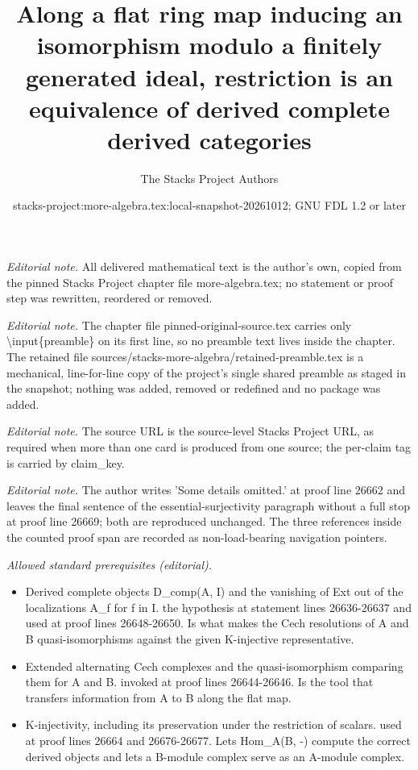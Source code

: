 \documentclass[10pt,a4paper]{amsart}
\title{Along a flat ring map inducing an isomorphism modulo a finitely generated ideal, restriction is an equivalence of derived complete derived categories}
\author{The Stacks Project Authors}
\date{stacks-project:more-algebra.tex:local-snapshot-20261012; GNU FDL 1.2 or later}
\theoremstyle{plain}
\theoremstyle{definition}
\theoremstyle{remark}
\numberwithin{equation}{subsection}
\begin{document}
\maketitle
\setcounter{subsection}{1}
\noindent\textit{Editorial note.} All delivered mathematical text is the author's own, copied from the pinned Stacks Project chapter file more-algebra.tex; no statement or proof step was rewritten, reordered or removed.\par\medskip
\noindent\textit{Editorial note.} The chapter file pinned-original-source.tex carries only \textbackslash{}input\{preamble\} on its first line, so no preamble text lives inside the chapter. The retained file sources/stacks-more-algebra/retained-preamble.tex is a mechanical, line-for-line copy of the project's single shared preamble as staged in the snapshot; nothing was added, removed or redefined and no package was added.\par\medskip
\noindent\textit{Editorial note.} The source URL is the source-level Stacks Project URL, as required when more than one card is produced from one source; the per-claim tag is carried by claim\_key.\par\medskip
\noindent\textit{Editorial note.} The author writes 'Some details omitted.' at proof line 26662 and leaves the final sentence of the essential-surjectivity paragraph without a full stop at proof line 26669; both are reproduced unchanged. The three references inside the counted proof span are recorded as non-load-bearing navigation pointers.\par\medskip
\noindent\textit{Allowed standard prerequisites (editorial).}\begin{itemize}
\item Derived complete objects D\_comp(A, I) and the vanishing of Ext out of the localizations A\_f for f in I. the hypothesis at statement lines 26636-26637 and used at proof lines 26648-26650. Is what makes the Cech resolutions of A and B quasi-isomorphisms against the given K-injective representative.
\item Extended alternating Cech complexes and the quasi-isomorphism comparing them for A and B. invoked at proof lines 26644-26646. Is the tool that transfers information from A to B along the flat map.
\item K-injectivity, including its preservation under the restriction of scalars. used at proof lines 26664 and 26676-26677. Lets Hom\_A(B, -) compute the correct derived objects and lets a B-module complex serve as an A-module complex.
\end{itemize}\medskip
\end{document}
